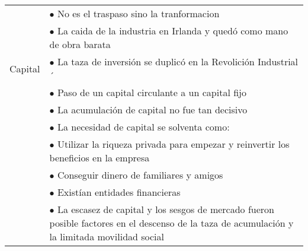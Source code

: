 \begin{tabular}{p{3cm}|p{11cm}}
          & $\bullet$ No es el traspaso sino la tranformacion                                                                                                       \\
          & $\bullet$ La caida de la industria en Irlanda y quedó como mano de obra barata                                                                          \\\hline
  Capital & $\bullet$ La taza de inversión se duplicó en la Revolición Industrial                               ´                                                    \\
          & $\bullet$ Paso de un capital circulante a un capital fijo                                                                                                       \\
          & $\bullet$ La acumulación de capital no fue tan decisivo                                                                                                 \\
          & $\bullet$ La necesidad de capital se solventa como:                                                                                                                     \\
          & \hspace{1cm} $\bullet$ Utilizar la riqueza privada para empezar y reinvertir los beneficios en la empresa                                               \\
          & \hspace{1cm} $\bullet$ Conseguir dinero de familiares y amigos                                                                                          \\
          & \hspace{1cm} $\bullet$ Existían entidades financieras                                                                                                   \\
          & $\bullet$ La escasez de capital y los sesgos de mercado fueron posible factores en el descenso de la taza de acumulación y la limitada movilidad social \\
\end{tabular}
\endgroup




